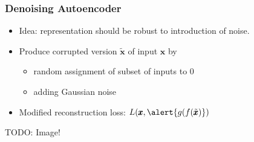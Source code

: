 \documentclass[11pt,mathserif]{beamer}
\renewcommand{\vec}[1]{{\boldsymbol{ #1}}}
\begin{document}
  
 
\begin{frame}
  \frametitle{Denoising Autoencoder}
 
    \begin{itemize}
       \item Idea: representation should be robust to introduction of noise.
       \item Produce corrupted version $\tilde{\vec x} $ of  input $\vec x$ by
     \begin{itemize}  
        \item random assignment of subset of inputs to 0 
      \item adding Gaussian noise 
       \end{itemize}
        \item Modified reconstruction loss: $L(\pmb{x}, \alert{g(f(\tilde{\pmb{x}})})$ %
    \end{itemize}

TODO: Image!    
    
\end{frame}
\end{document}
